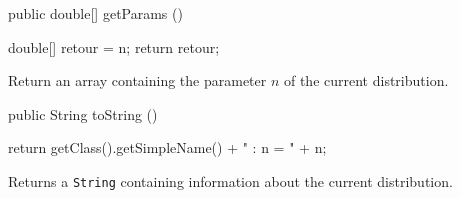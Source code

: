  \begin{code}

   public double[] getParams ()\begin{hide} {
      double[] retour = {n};
      return retour;
   }\end{hide}
\end{code}
\begin{tabb}
   Return an array containing the parameter $n$ of the current distribution.
\end{tabb}
\begin{hide}\begin{code}

   public String toString ()\begin{hide} {
      return getClass().getSimpleName() + " : n = " + n;
   }\end{hide}
\end{code}
\begin{tabb}
   Returns a \texttt{String} containing information about the current distribution.
\end{tabb}\end{hide}
\begin{code}\begin{hide}
}\end{hide}
\end{code}

